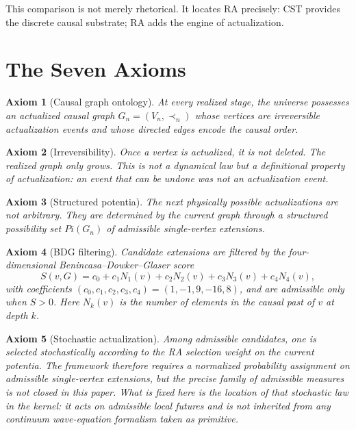 \documentclass[11pt]{article}
\def\Pi{Pi}%
\newtheorem{axiom}{Axiom}
\newcommand{\Pot}{\Pi}
\begin{document}
This comparison is not merely rhetorical. It locates RA precisely: CST provides the discrete causal substrate; RA adds the engine of actualization.


\section{The Seven Axioms}

\label{sec:axioms}

\begin{axiom}[Causal graph ontology]
\label{ax:graph}
At every realized stage, the universe possesses an actualized causal graph $G_n=(V_n,\prec_n)$ whose vertices are irreversible actualization events and whose directed edges encode the causal order.
\end{axiom}

\begin{axiom}[Irreversibility]
\label{ax:irrev}
Once a vertex is actualized, it is not deleted. The realized graph only grows. This is not a dynamical law but a definitional property of actualization: an event that can be undone was not an actualization event.
\end{axiom}

\begin{axiom}[Structured potentia]
\label{ax:potentia}
The next physically possible actualizations are not arbitrary. They are determined by the current graph through a structured possibility set $\Pot(G_n)$ of admissible single-vertex extensions.
\end{axiom}

\begin{axiom}[BDG filtering]
\label{ax:bdg}
Candidate extensions are filtered by the four-dimensional Benincasa--Dowker--Glaser score
\begin{equation}
\label{eq:bdg}
S(v,G)=c_0 + c_1 N_1(v)+c_2 N_2(v)+c_3 N_3(v)+c_4 N_4(v),
\end{equation}
with coefficients $(c_0,c_1,c_2,c_3,c_4)=(1,-1,9,-16,8)$, and are admissible only when $S>0$. Here $N_k(v)$ is the number of elements in the causal past of $v$ at depth $k$.
\end{axiom}

\begin{axiom}[Stochastic actualization]
\label{ax:stochastic}
Among admissible candidates, one is selected stochastically according to the RA selection weight on the current potentia. The framework therefore requires a normalized probability assignment on admissible single-vertex extensions, but the precise family of admissible measures is not closed in this paper. What is fixed here is the location of that stochastic law in the kernel: it acts on admissible local futures and is not inherited from any continuum wave-equation formalism taken as primitive.
\end{axiom}
\end{document}
